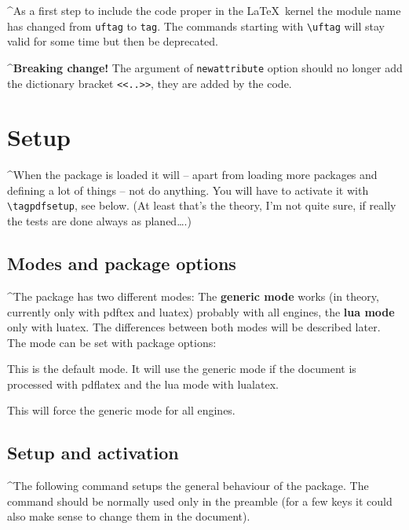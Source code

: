 \documentclass[DIV=12,parskip=half-,bibliography=totoc]{scrartcl}
\begin{document}
\TagP^As a first step to include the code proper in the \LaTeX\ kernel the module name has changed from \texttt{uftag} to \texttt{tag}. The commands starting with \verb|\uftag| will stay valid for some time but then be deprecated.\TagPend

\TagP^\textbf{Breaking change!} The argument of \texttt{newattribute} option should no longer add the dictionary bracket \verb+<<..>>+, they are added by the code.
\section{Setup}

\TagP^When the package is loaded it will -- apart from loading more packages and defining a lot of things -- not do anything. You will have to activate it with \verb+\tagpdfsetup+, see below. (At least that's the theory, I'm not quite sure, if really the tests are done always as planed\ldots.)
\TagPend


\subsection{Modes and package options}

\TagP^The package has two different modes: The \textbf{generic mode} works (in theory, currently only with pdftex and luatex) probably with all engines, the \textbf{lua mode} only with luatex. The differences between both modes  will be described later. The mode can be set with package options:


\TagP This is the default mode. It will use the generic mode if the document is processed with pdflatex and the lua mode with lualatex.


\TagP This will force the generic mode for all engines. \TagPend




\subsection{Setup and activation}\label{ssec:setup}

\TagP^The following command setups the general behaviour of the package. The command should be normally used only in the preamble (for a few keys it could also make sense to change them in the document).


\DescribeMacro{}
\end{document}
